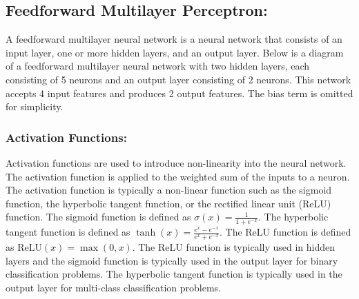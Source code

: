 \subsection{Feedforward Multilayer Perceptron:} A feedforward multilayer neural network is a neural network that consists of an input layer, one or more hidden layers, and an output layer. Below is a diagram of a feedforward multilayer neural network with two hidden layers, each consisting of 5 neurons and an output layer consisting of 2 neurons. This network accepts 4 input features and produces 2 output features. The bias term is omitted for simplicity.
\begin{center}
\end{center}

\subsubsection{Activation Functions:} Activation functions are used to introduce non-linearity into the neural network. The activation function is applied to the weighted sum of the inputs to a neuron. The activation function is typically a non-linear function such as the sigmoid function, the hyperbolic tangent function, or the rectified linear unit (ReLU) function. The sigmoid function is defined as \(\sigma(x)=\frac{1}{1+e^{-x}}\). The hyperbolic tangent function is defined as \(\tanh(x)=\frac{e^x-e^{-x}}{e^x+e^{-x}}\). The ReLU function is defined as \(\text{ReLU}(x)=\max(0,x)\). The ReLU function is typically used in hidden layers and the sigmoid function is typically used in the output layer for binary classification problems. The hyperbolic tangent function is typically used in the output layer for multi-class classification problems.
